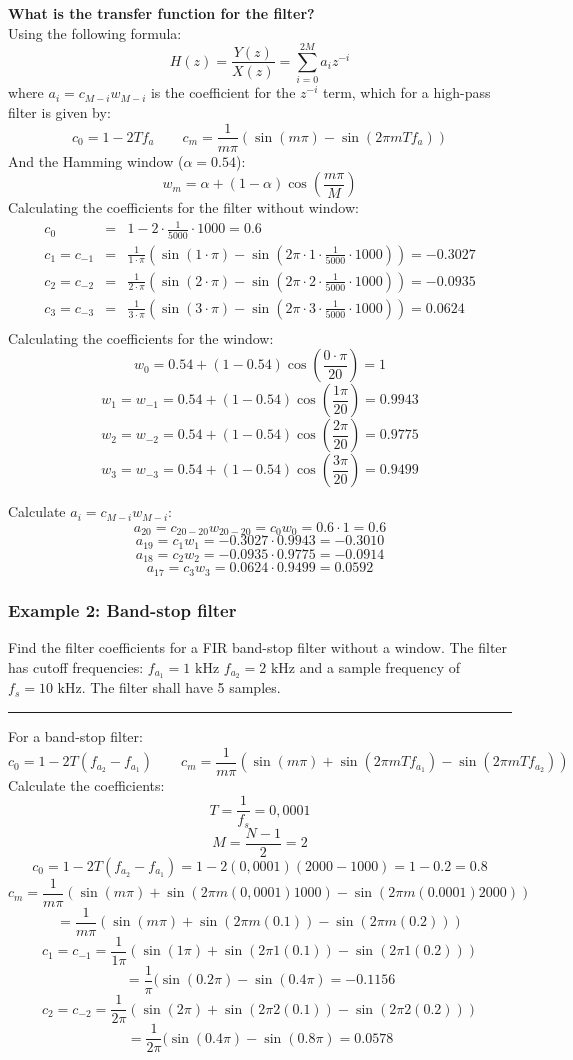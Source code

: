 \textbf{What is the transfer function for the filter?}\\
Using the following formula:
$$H(z)=\frac{Y(z)}{X(z)}=\sum_{i=0}^{2M}a_iz^{-i}$$
where $a_i=c_{M-i}w_{M-i}$ is the coefficient for the $z^{-i}$ term, which for a high-pass filter is given by:
$$c_0=1-2Tf_a\qquad c_m=\frac{1}{m\pi}(\sin(m\pi)-\sin(2\pi m T f_{a}))$$
And the Hamming window ($\alpha=0.54$):
$$w_m=\alpha+(1-\alpha)\cos\left(\frac{m\pi}{M}\right)$$
Calculating the coefficients for the filter without window:
\begin{eqnarray*}
c_0&=&1-2\cdot\frac{1}{5000}\cdot1000=0.6\\
c_1=c_{-1}&=&\frac{1}{1\cdot\pi}\left(\sin(1\cdot\pi)-\sin(2\pi\cdot 1\cdot\frac{1}{5000}\cdot1000)\right)=-0.3027\\
c_2=c_{-2}&=&\frac{1}{2\cdot\pi}\left(\sin(2\cdot\pi)-\sin(2\pi\cdot 2\cdot\frac{1}{5000}\cdot1000)\right)=-0.0935\\
c_3=c_{-3}&=&\frac{1}{3\cdot\pi}\left(\sin(3\cdot\pi)-\sin(2\pi\cdot 3\cdot\frac{1}{5000}\cdot1000)\right)=0.0624\\
\end{eqnarray*}
Calculating the coefficients for the window:
$$w_0=0.54+(1-0.54)\cos\left(\frac{0\cdot\pi}{20}\right)=1$$
$$w_1=w_{-1}=0.54+(1-0.54)\cos\left(\frac{1\pi}{20}\right)=0.9943$$
$$w_2=w_{-2}=0.54+(1-0.54)\cos\left(\frac{2\pi}{20}\right)=0.9775$$
$$w_3=w_{-3}=0.54+(1-0.54)\cos\left(\frac{3\pi}{20}\right)= 0.9499$$

Calculate $a_i=c_{M-i}w_{M-i}$:
$$a_{20}=c_{20-20}w_{20-20}=c_{0}w_{0}=0.6\cdot 1=0.6$$
$$a_{19}=c_1w_1=-0.3027\cdot 0.9943=-0.3010$$
$$a_{18}=c_2w_2=-0.0935\cdot 0.9775=-0.0914$$
$$a_{17}=c_3w_3=0.0624\cdot 0.9499=0.0592$$

\subsubsection{Example 2: Band-stop filter}
Find the filter coefficients for a FIR band-stop filter without a window. 
The filter has cutoff frequencies: $f_{a_1}=1\text{ kHz }f_{a_2}=2\text{ kHz}$ and a sample frequency of $f_s=10\text{ kHz}$.
The filter shall have 5 samples.

\rule{\textwidth}{0.5pt}

For a band-stop filter:
$$c_0=1-2T(f_{a_2}-f_{a_1})\qquad c_m=\frac{1}{m\pi}(\sin(m\pi)+\sin(2\pi m T f_{a_{1}})-\sin(2\pi m T f_{a_{2}}))$$
Calculate the coefficients:
$$T=\frac{1}{f_s}=0,0001$$
$$M=\frac{N-1}{2}=2$$
$$c_0=1-2T(f_{a_2}-f_{a_1})=1-2(0,0001)(2000-1000)=1-0.2=\boxed{0.8}$$
$$c_m=\frac{1}{m\pi}(\sin(m\pi)+\sin(2\pi m (0,0001) 1000)-\sin(2\pi m (0.0001) 2000))$$
$$=\frac{1}{m\pi}(\sin(m\pi)+\sin(2\pi m (0.1))-\sin(2\pi m (0.2)))$$
$$c_1=c_{-1}=\frac{1}{1\pi}(\sin(1\pi)+\sin(2\pi 1 (0.1))-\sin(2\pi 1 (0.2)))$$
$$=\frac{1}{\pi}(\sin(0.2\pi)-\sin(0.4\pi)=\boxed{-0.1156}$$
$$c_2=c_{-2}=\frac{1}{2\pi}(\sin(2\pi)+\sin(2\pi 2 (0.1))-\sin(2\pi 2 (0.2)))$$
$$=\frac{1}{2\pi}(\sin(0.4\pi)-\sin(0.8\pi)=\boxed{0.0578}$$
